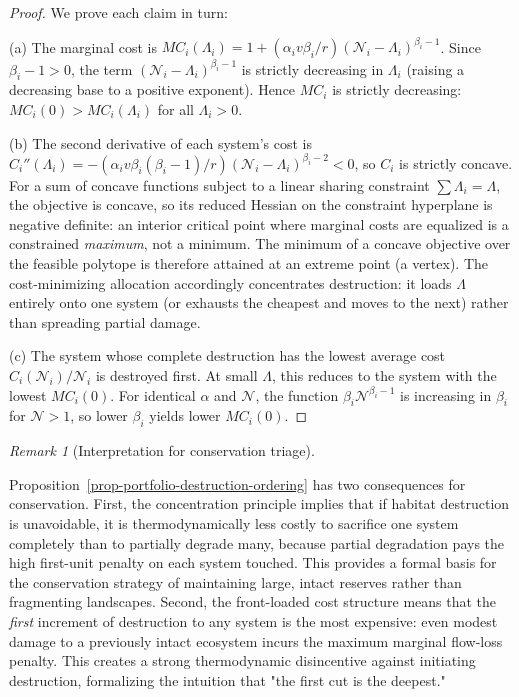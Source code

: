 \documentclass[11pt]{article}
\theoremstyle{plain}
\theoremstyle{definition}
\theoremstyle{remark}
\newtheorem{remark}{Remark}
\begin{document}
\begin{proof}
We prove each claim in turn:

(a) The marginal cost is $MC_i(\Lambda_i) = 1 + (\alpha_i v \beta_i / r)(\mathcal{N}_i - \Lambda_i)^{\beta_i - 1}$. Since $\beta_i - 1 > 0$, the term $(\mathcal{N}_i - \Lambda_i)^{\beta_i-1}$ is strictly decreasing in $\Lambda_i$ (raising a decreasing base to a positive exponent). Hence $MC_i$ is strictly decreasing: $MC_i(0) > MC_i(\Lambda_i)$ for all $\Lambda_i > 0$.

(b) The second derivative of each system's cost is $C_i''(\Lambda_i) = -(\alpha_i v \beta_i (\beta_i - 1)/r)(\mathcal{N}_i - \Lambda_i)^{\beta_i - 2} < 0$, so $C_i$ is strictly concave. For a sum of concave functions subject to a linear sharing constraint $\sum \Lambda_i = \Lambda$, the objective is concave, so its reduced Hessian on the constraint hyperplane is negative definite: an interior critical point where marginal costs are equalized is a constrained \emph{maximum}, not a minimum. The minimum of a concave objective over the feasible polytope is therefore attained at an extreme point (a vertex). The cost-minimizing allocation accordingly concentrates destruction: it loads $\Lambda$ entirely onto one system (or exhausts the cheapest and moves to the next) rather than spreading partial damage.

(c) The system whose complete destruction has the lowest average cost $C_i(\mathcal{N}_i)/\mathcal{N}_i$ is destroyed first. At small $\Lambda$, this reduces to the system with the lowest $MC_i(0)$. For identical $\alpha$ and $\mathcal{N}$, the function $\beta_i \mathcal{N}^{\beta_i - 1}$ is increasing in $\beta_i$ for $\mathcal{N} > 1$, so lower $\beta_i$ yields lower $MC_i(0)$.
\end{proof}

\begin{remark}[Interpretation for conservation triage]
\label{rem-conservation-triage}

Proposition~\ref{prop-portfolio-destruction-ordering} has two consequences for conservation. First, the concentration principle implies that if habitat destruction is unavoidable, it is thermodynamically less costly to sacrifice one system completely than to partially degrade many, because partial degradation pays the high first-unit penalty on each system touched. This provides a formal basis for the conservation strategy of maintaining large, intact reserves rather than fragmenting landscapes. Second, the front-loaded cost structure means that the \emph{first} increment of destruction to any system is the most expensive: even modest damage to a previously intact ecosystem incurs the maximum marginal flow-loss penalty. This creates a strong thermodynamic disincentive against initiating destruction, formalizing the intuition that "the first cut is the deepest."
\end{remark}
\end{document}
